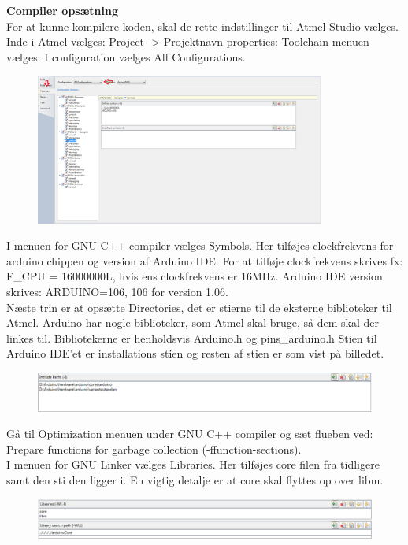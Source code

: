 \textbf{Compiler opsætning} \\
For at kunne kompilere koden, skal de rette indstillinger til Atmel Studio vælges. 
Inde i Atmel vælges: Project -> Projektnavn properties:
Toolchain menuen vælges. I configuration vælges All Configurations.

\begin{figure}[H]
	\centering
	\includegraphics[width=0.85\textwidth]{Billeder/implementation/Howtoguide/atmel_toolchain.png}
\end{figure}

I menuen for GNU C++ compiler vælges Symbols. Her tilføjes clockfrekvens for arduino chippen og version af Arduino IDE.
For at tilføje clockfrekvens skrives fx: F\_CPU = 16000000L, hvis ens clockfrekvens er 16MHz.
Arduino IDE version skrives: ARDUINO=106, 106 for version 1.06. \\

Næste trin er at opsætte Directories, det er stierne til de eksterne biblioteker til Atmel. Arduino har nogle biblioteker, som Atmel skal bruge, så dem skal der linkes til.
Bibliotekerne er henholdsvis Arduino.h og pins\_arduino.h
Stien til Arduino IDE'et er installations stien og resten af stien er som vist på billedet.
\begin{figure}[H]
	\centering
	\includegraphics[width=1\textwidth]{Billeder/implementation/Howtoguide/atmel_directories.png}
\end{figure}

Gå til Optimization menuen under GNU C++ compiler og sæt flueben ved: Prepare functions for garbage collection (-ffunction-sections).\\

I menuen for GNU Linker vælges Libraries. Her tilføjes core filen fra tidligere samt den sti den ligger i. En vigtig detalje er at core skal flyttes op over libm.
\begin{figure}[H]
	\centering
	\includegraphics[width=1\textwidth]{Billeder/implementation/Howtoguide/atmel_linker.png}
\end{figure}

